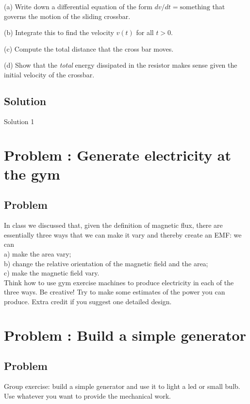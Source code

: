 \documentclass[solutions]{esg8022pset}
\begin{document}
\par\noindent (a) Write down a differential equation of the form
$dv/dt = \mbox{something}$ that governs the motion of the sliding
crossbar.

\par\noindent (b) Integrate this to find the velocity $v(t)$ for all
$t > 0$.

\par\noindent (c) Compute the total distance that the cross bar moves.

\par\noindent (d) Show that the {\it total} energy dissipated in the
resistor makes sense given the initial velocity of the crossbar.
\subsection{Solution}
  Solution 1
\section{Problem \thesection: Generate electricity at the gym}
\subsection{Problem}
In class we discussed that, given the definition of magnetic flux, there are essentially three ways that we can make it vary and thereby create an EMF: we can \\
\noindent a) make the area vary;\\
\noindent b) change the relative orientation of the magnetic field and the area; \\
\noindent c) make the magnetic field vary. \\

\noindent Think how to use gym exercise machines to produce electricity in each of the three ways. Be creative!
Try to make some estimates of the power you can produce. Extra credit if you suggest one detailed design.
\section{Problem \thesection: Build a simple generator}
\subsection{Problem}
 Group exercise: build a simple generator and use it to light a led or small bulb. Use whatever you want to
  provide the mechanical work.
 
\end{document}
